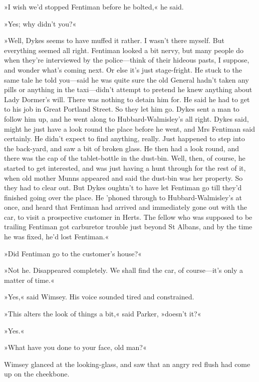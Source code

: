»I wish we'd stopped Fentiman before he bolted,« he said.

»Yes; why didn't you?«

»Well, Dykes seems to have muffed it rather. I wasn't there myself. But everything seemed all right. Fentiman looked a bit nervy, but many people do when they're interviewed by the police\allowbreak---\allowbreak think of their hideous pasts, I suppose, and wonder what's coming next. Or else it's just stage-fright. He stuck to the same tale he told you\allowbreak---\allowbreak said he was quite sure the old General hadn't taken any pills or anything in the taxi\allowbreak---\allowbreak didn't attempt to pretend he knew anything about Lady Dormer's will. There was nothing to detain him for. He said he had to get to his job in Great Portland Street. So they let him go. Dykes sent a man to follow him up, and he went along to Hubbard-Walmisley's all right. Dykes said, might he just have a look round the place before he went, and Mrs Fentiman said certainly. He didn't expect to find anything, really. Just happened to step into the back-yard, and saw a bit of broken glass. He then had a look round, and there was the cap of the tablet-bottle in the dust-bin. Well, then, of course, he started to get interested, and was just having a hunt through for the rest of it, when old mother Munns appeared and said the dust-bin was her property. So they had to clear out. But Dykes oughtn't to have let Fentiman go till they'd finished going over the place. He 'phoned through to Hubbard-Walmisley's at once, and heard that Fentiman had arrived and immediately gone out with the car, to visit a prospective customer in Herts. The fellow who was supposed to be trailing Fentiman got carburetor trouble just beyond St Albans, and by the time he was fixed, he'd lost Fentiman.«

»Did Fentiman go to the customer's house?«

»Not he. Disappeared completely. We shall find the car, of course\allowbreak---\allowbreak it's only a matter of time.«

»Yes,« said Wimsey. His voice sounded tired and constrained.

»This alters the look of things a bit,« said Parker, »doesn't it?«

»Yes.«

»What have you done to your face, old man?«

Wimsey glanced at the looking-glass, and saw that an angry red flush had come up on the cheekbone.

